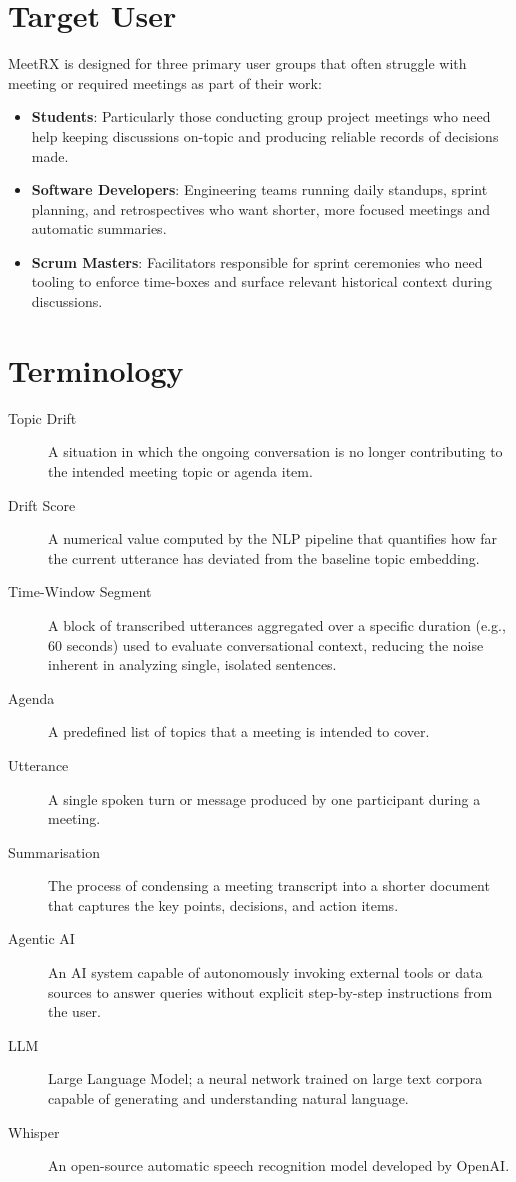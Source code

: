 \section{Target User}
\label{section:target-user}

MeetRX is designed for three primary user groups that often struggle with meeting or required meetings as part of their work:

\begin{itemize}
    \item \textbf{Students}: Particularly those conducting group project meetings who need help keeping
          discussions on-topic and producing reliable records of decisions made.
    \item \textbf{Software Developers}: Engineering teams running daily standups, sprint planning, and
          retrospectives who want shorter, more focused meetings and automatic summaries.
    \item \textbf{Scrum Masters}: Facilitators responsible for sprint ceremonies who need tooling to
          enforce time-boxes and surface relevant historical context during discussions.
\end{itemize}

\pagebreak

\section{Terminology}
\label{section:terminology}

\begin{description}
    \item[Topic Drift] A situation in which the ongoing conversation is no longer contributing to the
          intended meeting topic or agenda item.
    \item[Drift Score] A numerical value computed by the NLP pipeline that quantifies how far the current
          utterance has deviated from the baseline topic embedding.
    \item[Time-Window Segment] A block of transcribed utterances aggregated over a specific duration (e.g., 60 seconds) used to evaluate conversational context, reducing the noise inherent in analyzing single, isolated sentences.
    \item[Agenda] A predefined list of topics that a meeting is intended to cover.
    \item[Utterance] A single spoken turn or message produced by one participant during a meeting.
    \item[Summarisation] The process of condensing a meeting transcript into a shorter document that
          captures the key points, decisions, and action items.
    \item[Agentic AI] An AI system capable of autonomously invoking external tools or data sources to
          answer queries without explicit step-by-step instructions from the user.
    \item[LLM] Large Language Model; a neural network trained on large text corpora capable of generating
          and understanding natural language.
    \item[Whisper] An open-source automatic speech recognition model developed by OpenAI.
\end{description}